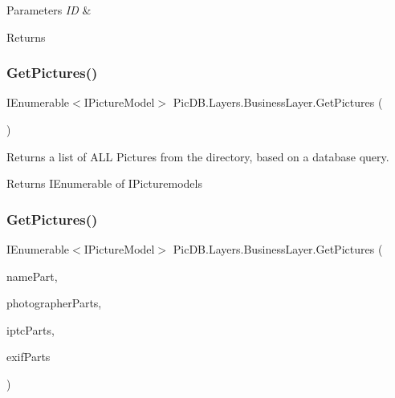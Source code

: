 \begin{DoxyParams}{Parameters}
{\em ID} & \\
\hline
\end{DoxyParams}
\begin{DoxyReturn}{Returns}

\end{DoxyReturn}
\mbox{\label{class_pic_d_b_1_1_layers_1_1_business_layer_acefa17fa294a25fc215b4f4804bc7a77}} 
\subsubsection{\texorpdfstring{Get\+Pictures()}{GetPictures()}\hspace{0.1cm}{\footnotesize\ttfamily [1/2]}}
{\footnotesize\ttfamily I\+Enumerable$<$I\+Picture\+Model$>$ Pic\+D\+B.\+Layers.\+Business\+Layer.\+Get\+Pictures (\begin{DoxyParamCaption}{ }\end{DoxyParamCaption})}



Returns a list of A\+LL Pictures from the directory, based on a database query. 

\begin{DoxyReturn}{Returns}
I\+Enumerable of I\+Picturemodels
\end{DoxyReturn}
\mbox{\label{class_pic_d_b_1_1_layers_1_1_business_layer_ab86c57b9679d4ab80db0a0cf6ce73daf}} 
\subsubsection{\texorpdfstring{Get\+Pictures()}{GetPictures()}\hspace{0.1cm}{\footnotesize\ttfamily [2/2]}}
{\footnotesize\ttfamily I\+Enumerable$<$I\+Picture\+Model$>$ Pic\+D\+B.\+Layers.\+Business\+Layer.\+Get\+Pictures (\begin{DoxyParamCaption}\item[{string}]{name\+Part,  }\item[{I\+Photographer\+Model}]{photographer\+Parts,  }\item[{I\+I\+P\+T\+C\+Model}]{iptc\+Parts,  }\item[{I\+E\+X\+I\+F\+Model}]{exif\+Parts }\end{DoxyParamCaption})}



